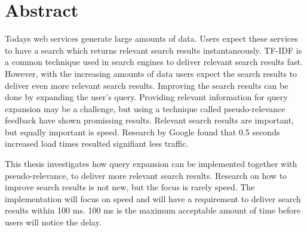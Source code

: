 \chapter*{Abstract}
Todays web services generate large amounts of data.
Users expect these services to have a search which returns relevant search results instantaneously.
TF-IDF is a common technique used in search engines to deliver relevant search results fast.
However,
with the increasing amounts of data users expect the search results to deliver even more relevant search results.
Improving the search results can be done by expanding the user's query.
Providing relevant information for query expansion may be a challenge,
but using a technique called pseudo-relevance feedback have shown promissing results.
Relevant search results are important, but equally important is speed.
Research by Google \cite{google-marissa} found that 0.5 seconds increased load times resulted signifiant less traffic.

This thesis investigates how query expansion can be implemented together with pseudo-relevance,
to deliver more relevant search results.
Research on how to improve search results is not new,
but the focus is rarely speed.
The implementation will focus on speed and will have a requirement to deliver search results within 100 ms.
100 ms is the maximum acceptable amount of time before users will notice the delay.

